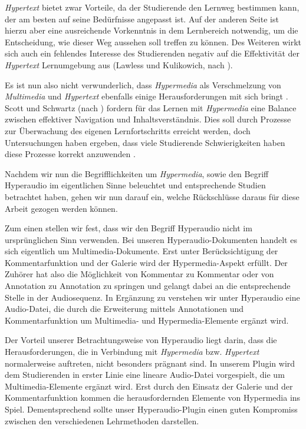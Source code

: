 \textit{Hypertext} bietet zwar Vorteile, da der Studierende den Lernweg bestimmen kann, der am besten auf seine Bedürfnisse angepasst ist. Auf der anderen Seite ist hierzu aber eine ausreichende Vorkenntnis in dem Lernbereich notwendig, um die Entscheidung, wie dieser Weg aussehen soll treffen zu können. Des Weiteren wirkt sich auch ein fehlendes Interesse des Studierenden negativ auf die Effektivität der \textit{Hypertext} Lernumgebung aus (Lawless und Kulikowich, nach \cite{moos2010multimedia}).

Es ist nun also nicht verwunderlich, dass \textit{Hypermedia} als Verschmelzung von \textit{Multimedia} und \textit{Hypertext} ebenfalls einige Herausforderungen mit sich bringt \citep{moos2010multimedia}. Scott und Schwartz (nach \cite{moos2010multimedia}) fordern für das Lernen mit \textit{Hypermedia} eine Balance zwischen effektiver Navigation und Inhaltsverständnis. Dies soll durch Prozesse zur Überwachung des eigenen Lernfortschritts erreicht werden, doch Untersuchungen haben ergeben, dass viele Studierende Schwierigkeiten haben diese Prozesse korrekt anzuwenden \citep{moos2010multimedia}.

\label{sec:audiocues}

Nachdem wir nun die Begrifflichkeiten um \textit{Hypermedia}, sowie den Begriff Hyperaudio im eigentlichen Sinne beleuchtet und entsprechende Studien betrachtet haben, gehen wir nun darauf ein, welche Rückschlüsse daraus für diese Arbeit gezogen werden können.

Zum einen stellen wir fest, dass wir den Begriff Hyperaudio nicht im ursprünglichen Sinn verwenden. Bei unseren Hyperaudio-Dokumenten handelt es sich eigentlich um Multimedia-Dokumente. Erst unter Berücksichtigung der Kommentarfunktion und der Galerie wird der Hypermedia-Aspekt erfüllt. Der Zuhörer hat also die Möglichkeit von Kommentar zu Kommentar oder von Annotation zu Annotation zu springen und gelangt dabei an die entsprechende Stelle in der Audiosequenz. In Ergänzung zu \cite{zumbach2006learning} verstehen wir unter Hyperaudio eine Audio-Datei, die durch die Erweiterung mittels Annotationen und Kommentarfunktion um Multimedia- und Hypermedia-Elemente ergänzt wird.

Der Vorteil unserer Betrachtungsweise von Hyperaudio liegt darin, dass die Herausforderungen, die in Verbindung mit \textit{Hypermedia} bzw. \textit{Hypertext} normalerweise auftreten, nicht besonders prägnant sind. In unserem Plugin wird dem Studierenden in erster Linie eine lineare Audio-Datei vorgespielt, die um Multimedia-Elemente ergänzt wird. Erst durch den Einsatz der Galerie und der Kommentarfunktion kommen die herausfordernden Elemente von Hypermedia ins Spiel. Dementsprechend sollte unser Hyperaudio-Plugin einen guten Kompromiss zwischen den verschiedenen Lehrmethoden darstellen.


